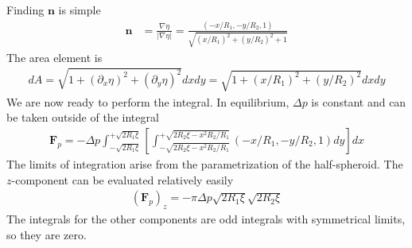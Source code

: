 \documentclass[a4paper, 12pt]{article}
\numberwithin{equation}{subsubsection}
\begin{document}
Finding $\mathbf{n}$ is simple
\begin{align}
	\mathbf{n} &= \frac{\nabla \eta}{|\nabla \eta|} = \frac{(-x/R_1, -y/R_2, 1)}{\sqrt{(x/R_1)^2 + (y/R_2)^2 + 1}}
\end{align}
The area element is
\begin{align}
	dA = \sqrt{1 + (\partial_x \eta)^2 + (\partial_y \eta)^2} dx dy = \sqrt{1 + (x/R_1)^2 + (y/R_2)^2} dx dy
\end{align}
We are now ready to perform the integral. In equilibrium, $\Delta p$ is constant and can be taken outside of the integral
\begin{align}
	\mathbf{F}_p = - \Delta p \int_{-\sqrt{2R_1 \xi}}^{+\sqrt{2R_1 \xi}} \left[ \int_{-\sqrt{2 R_2 \xi - x^2 R_2/R_1}}^{+\sqrt{2 R_2 \xi - x^2 R_2/R_1}} (-x/R_1, -y/R_2, 1) dy \right] dx
\end{align}
The limits of integration arise from the parametrization of the half-spheroid. The $z$-component can be evaluated relatively easily
\begin{align}
	(\mathbf{F}_p)_z = - \pi \Delta p \sqrt{2 R_1 \xi}\sqrt{2 R_2 \xi}
\end{align}
The integrals for the other components are odd integrals with symmetrical limits, so they are zero. 
\end{document}
